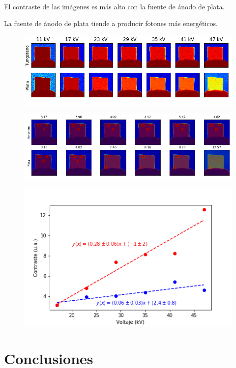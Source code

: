 \documentclass{sciposter}
\begin{document}
\begin{multicols}{3}
	El contraste de las imágenes es más alto con la fuente de ánodo de plata.
	
	La fuente de ánodo de plata tiende a producir fotones más energéticos.
	
	\begin{figure}[h]
		\centering
		\includegraphics[width = \linewidth]{Figuras/Images.png}
	\end{figure}
	
	\begin{figure}[h]
		\centering
		\includegraphics[width = \linewidth]{Figuras/ContrasteImages.png}
	\end{figure}
	
	\begin{figure}[h]
		\centering
		\includegraphics[width = 0.7\linewidth]{Figuras/Contraste.png}
	\end{figure}

\section{Conclusiones}


\end{multicols}
\end{document}
